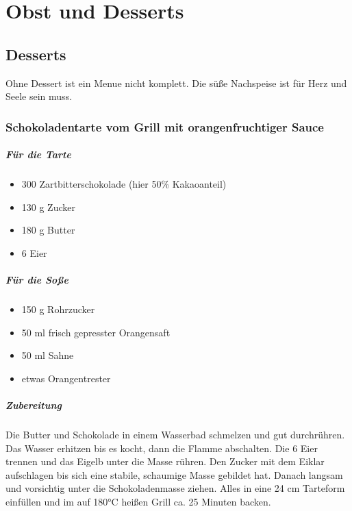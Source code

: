 \chapter{Obst und Desserts}\label{Chapter7}

\section{Desserts}

Ohne Dessert ist ein Menue nicht komplett. Die süße Nachspeise ist für Herz 
und Seele sein muss.

\subsection{Schokoladentarte vom Grill mit orangenfruchtiger Sauce}

\paragraph{Für die Tarte}

\begin{itemize}[noitemsep]
	\item 300 Zartbitterschokolade (hier 50\% Kakaoanteil)
	\item 130 g Zucker
	\item 180 g Butter
	\item 6 Eier
\end{itemize}

\paragraph{Für die Soße}

\begin{itemize}[noitemsep]
	\item 150 g Rohrzucker
	\item 50 ml frisch gepresster Orangensaft
	\item 50 ml Sahne
	\item etwas Orangentrester
\end{itemize}

\paragraph{Zubereitung}

Die Butter und Schokolade in einem Wasserbad schmelzen und gut 
durchrühren. Das Wasser erhitzen bis es kocht, dann die Flamme abschalten. 
Die 6 Eier  trennen und das Eigelb unter die Masse rühren. Den Zucker mit dem 
Eiklar aufschlagen bis sich eine stabile, schaumige Masse gebildet hat. Danach 
langsam und vorsichtig unter die Schokoladenmasse ziehen. Alles in eine 24 
cm Tarteform einfüllen und im auf 180°C heißen Grill ca. 25 Minuten backen.

